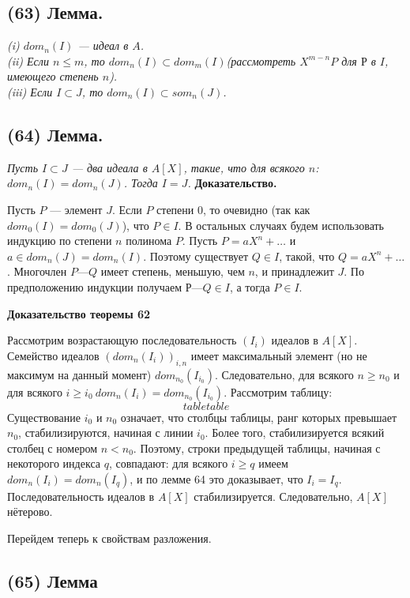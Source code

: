 \documentclass{mai_book}
\begin{document}
\subsection*{(63) Лемма.}

\textit{(i) $dom_{n}(I)$ — идеал в $A$.\\
(ii) Если $n\leqslant m$, то $dom_{n}(I)\subset dom_{m}(I)$(рассмотреть $X^{m-n}P$ для $Р$ в $I$, имеющего степень $n$).\\
(iii) Если $I\subset J$, то $dom_{n}(I)\subset som_{n}(J)$.}
\subsection*{(64) Лемма.}
\textit{Пусть $I\subset J$ — два идеала в $A[X]$, такие, что для всякого $n$: $dom_{n}(I) = dom_{n}(J)$. Тогда $I=J$.}
\newpage
\textbf{Доказательство.}

Пусть $P$ — элемент $J$. Если $P$ степени $0$, то очевидно (так как $dom_{0}(I)=dom_{0}(J)$), что $P\in I$. В остальных случаях будем исполь­зовать индукцию по степени $n$ полинома $P$. Пусть $P=aX^n+\ldots$ и $a\in dom_{n}(J)=dom_{n}(I)$. Поэтому существует $Q\in I$, такой, что $Q=aX^n+\ldots$. Многочлен $P — Q$ имеет степень, меньшую, чем $n$, и принадлежит $J$. По предположению индукции получаем $Р — Q\in I$, а тогда $P\in I$.

\textbf{Доказательство теоремы 62}

Рассмотрим возрастающую последовательность $(I_{i})$ идеалов в $A[X]$. Семейство идеалов $(dom_{n}(I_{i}))_{i,n}$ имеет максимальный элемент (но не максимум на данный момент) $dom_{n_{0}}(I_{i_{0}})$. Следовательно, для всякого $n\geqslant n_{0}$ и для всякого $i\geqslant i_{0}\:dom_{n}(I_{i})=dom_{n_{0}}(I_{i_{0}})$. Рассмотрим таблицу:
$$tabletable$$
Существование $i_{0}$ и $n_{0}$ означает, что столбцы таблицы, ранг которых превышает $n_{0}$, стабилизируются, начиная с линии $i_{0}$. Более того, стабилизируется всякий столбец с номером $n<n_{0}$. Поэтому, строки предыдущей таблицы, начиная с некоторого индекса $q$, совпадают: для всякого $i\geqslant q$ имеем $dom_{n}(I_{i})=dom_{n}(I_{q})$, и по лемме 64 это доказыва­ет, что $I_{i}=I_{q}$. Последовательность идеалов в $A[X]$ стабилизируется. Следовательно, $A[X]$ нётерово.

Перейдем теперь к свойствам разложения.

\subsection*{(65) Лемма }
\end{document}
